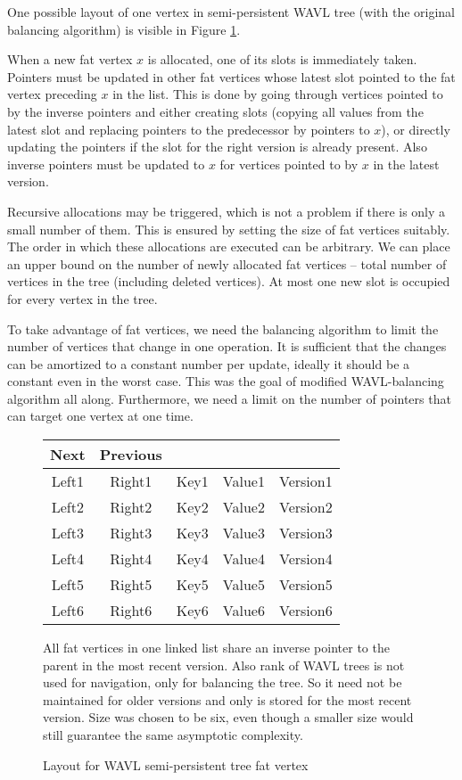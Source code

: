 One possible layout of one vertex in semi-persistent WAVL tree (with the original balancing algorithm) is visible in Figure \ref{fig:semi-layout}.

When a new fat vertex $x$ is allocated, one of its slots is immediately taken. 
Pointers must be updated in other fat vertices whose latest slot pointed to the fat vertex preceding $x$ in the list. 
This is done by going through vertices pointed to by the inverse pointers and either creating slots (copying all values from the latest slot and replacing pointers to the predecessor by pointers to $x$), or directly updating the pointers if the slot for the right version is already present. 
Also inverse pointers must be updated to $x$ for vertices pointed to by $x$ in the latest version.

Recursive allocations may be triggered, which is not a problem if there is only a small number of them. 
This is ensured by setting the size of fat vertices suitably. 
The order in which these allocations are executed can be arbitrary.
We can place an upper bound on the number of newly allocated fat vertices -- total number of vertices in the tree (including deleted vertices). 
At most one new slot is occupied for every vertex in the tree.

To take advantage of fat vertices, we need the balancing algorithm to limit the number of vertices that change in one operation. 
It is sufficient that the changes can be amortized to a constant number per update, ideally it should be a constant even in the worst case.
This was the goal of modified WAVL-balancing algorithm all along. 
Furthermore, we need a limit on the number of pointers that can target one vertex at one time.

\begin{figure}
	\begin{center}
		\ttfamily
		\begin{tabular}{ccccc}
			Next  & Previous &      &        &          \\ \hline
			Left1 &  Right1  & Key1 & Value1 & Version1 \\ \hline
			Left2 &  Right2  & Key2 & Value2 & Version2 \\ \hline
			Left3 &  Right3  & Key3 & Value3 & Version3 \\ \hline
			Left4 &  Right4  & Key4 & Value4 & Version4 \\ \hline
			Left5 &  Right5  & Key5 & Value5 & Version5 \\ \hline
			Left6 &  Right6  & Key6 & Value6 & Version6 \\ \hline
		\end{tabular}
	\end{center}
All fat vertices in one linked list share an inverse pointer to the parent in the most recent version. Also rank of WAVL trees is not used for navigation, only for balancing the tree. So it need not be maintained for older versions and only is stored for the most recent version. Size was chosen to be six, even though a smaller size would still guarantee the same asymptotic complexity.
\caption{Layout for WAVL semi-persistent tree fat vertex}
\label{fig:semi-layout}
\end{figure}

